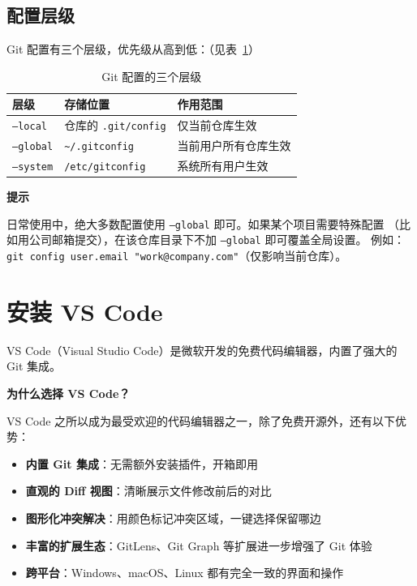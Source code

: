 \documentclass[12pt,a4paper,openany]{ctexbook}
\newenvironment{tipbox}{%
  \medskip
  \noindent\textbf{\faLightbulb\; 提示}
  \smallskip
}{%
  \medskip
}
\begin{document}
\subsection{配置层级}

Git 配置有三个层级，优先级从高到低：（见表~\ref{tab:config-levels}）

\begin{table}[h]
\centering
\caption{Git 配置的三个层级}\label{tab:config-levels}
\begin{tabularx}{\textwidth}{l l >{\raggedright\arraybackslash}X}
\toprule
\textbf{层级} & \textbf{存储位置} & \textbf{作用范围} \\
\midrule
\texttt{--local} & 仓库的 \texttt{.git/config} & 仅当前仓库生效 \\
\texttt{--global} & \texttt{\~{}/.gitconfig} & 当前用户所有仓库生效 \\
\texttt{--system} & \texttt{/etc/gitconfig} & 系统所有用户生效 \\
\bottomrule
\end{tabularx}
\end{table}

\begin{tipbox}
日常使用中，绝大多数配置使用 \texttt{--global} 即可。如果某个项目需要特殊配置
（比如用公司邮箱提交），在该仓库目录下不加 \texttt{--global} 即可覆盖全局设置。
例如：\texttt{git config user.email "work@company.com"}（仅影响当前仓库）。
\end{tipbox}

\section{安装 VS Code}

VS Code（Visual Studio Code）是微软开发的免费代码编辑器，内置了强大的 Git 集成。

\begin{infobox}
\textbf{为什么选择 VS Code？}

VS Code 之所以成为最受欢迎的代码编辑器之一，除了免费开源外，还有以下优势：
\begin{itemize}
  \item \textbf{内置 Git 集成}：无需额外安装插件，开箱即用
  \item \textbf{直观的 Diff 视图}：清晰展示文件修改前后的对比
  \item \textbf{图形化冲突解决}：用颜色标记冲突区域，一键选择保留哪边
  \item \textbf{丰富的扩展生态}：GitLens、Git Graph 等扩展进一步增强了 Git 体验
  \item \textbf{跨平台}：Windows、macOS、Linux 都有完全一致的界面和操作
\end{itemize}
\end{infobox}
\end{document}
